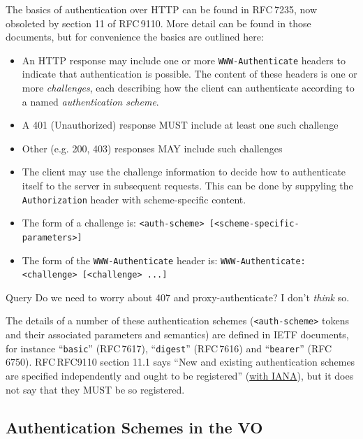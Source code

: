 \documentclass[11pt,a4paper]{ivoa}
\newcommand{\rfc}[1]{RFC\,#1}
\newcommand{\header}[1]{{\tt #1}}
\begin{document}
The basics of authentication over HTTP can be found in \rfc{7235},
now obsoleted by section 11 of \rfc{9110}.
More detail can be found in those documents, but for convenience
the basics are outlined here:
\begin{itemize}
  \item An HTTP response may include one or more 
        \header{WWW-Authenticate} headers
        to indicate that authentication is possible.
        The content of these headers is one or more {\em challenges},
        each describing how the client can authenticate according
        to a named {\em authentication scheme}.
  \item A 401 (Unauthorized) response MUST include at least one such challenge
  \item Other (e.g. 200, 403) responses MAY include such challenges
  \item The client may use the challenge information to decide how
        to authenticate itself to the server in subsequent requests.
        This can be done by suppyling the \header{Authorization} header
        with scheme-specific content.
  \item The form of a challenge is:
        \verb|<auth-scheme> [<scheme-specific-parameters>]|
  \item The form of the \header{WWW-Authenticate} header is:
        \verb|WWW-Authenticate: <challenge> [<challenge> ...]|
\end{itemize}

\begin{admonition}{Query}
   Do we need to worry about 407 and proxy-authenticate?
   I don't {\em think\/} so.
\end{admonition}

The details of a number of these authentication schemes
(\verb|<auth-scheme>| tokens and their associated parameters and semantics)
are defined in IETF documents, for instance
``{\tt basic}'' (\rfc{7617}),
``{\tt digest}'' (\rfc{7616})
and
``{\tt bearer}'' (\rfc{6750}).
\rfc{RFC9110} section 11.1 says
``New and existing authentication schemes are
  specified independently and ought to be registered''
  (\href{https://www.iana.org/assignments/http-authschemes}{with IANA}),
but it does not say that they MUST be so registered.



\subsection{Authentication Schemes in the VO}
\end{document}
